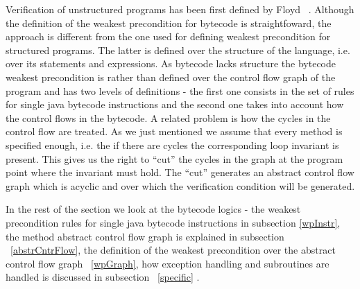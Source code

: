 Verification of unstructured programs has been first defined by Floyd ~\cite{F67amp}. Although the definition of the weakest precondition for bytecode is straightfoward, the approach is different from the one used for defining weakest precondition for structured programs. The latter is defined over the structure of the language, i.e. over its statements and expressions. As bytecode lacks structure the bytecode weakest precondition is rather than defined over the control flow graph of the program and has two levels of definitions - the first one consists in the set of rules for single java bytecode instructions and the second one takes into account how the control flows in the bytecode. A related problem is how the cycles in the control flow are treated. As we just mentioned we assume that every method is specified enough, i.e. the if there are cycles the corresponding loop invariant is present. This gives us the right to ``cut'' the cycles in the graph at the program point where the invariant must hold. The ``cut'' generates an abstract control flow graph which is acyclic and over which the verification condition will be generated.  

In the rest of the section we look at the bytecode logics - the weakest precondition rules for single java bytecode instructions in subsection \ref{wpInstr}, the method abstract control flow graph is explained in subsection ~\ref{abstrCntrFlow}, the definition of the weakest precondition over the abstract control flow graph ~\ref{wpGraph}, how exception handling and subroutines are handled is discussed in subsection ~\ref{specific} .











